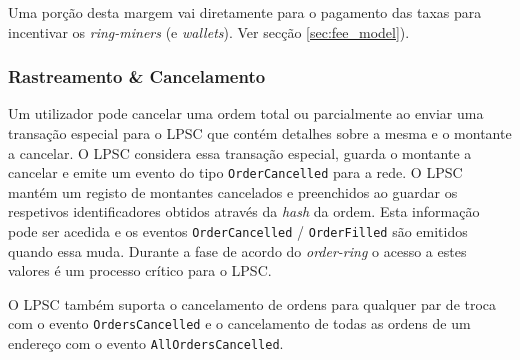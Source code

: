 \documentclass[UTF8,nofonts]{article}
\begin{document}
\begin{multicols}{2}
\begin{enumerate}

Uma porção desta margem vai diretamente para o pagamento das taxas para incentivar os \textit{ring-miners} (e \textit{wallets}). Ver secção 
\ref{sec:fee_model}).

\subsubsection{Rastreamento \& Cancelamento}


Um utilizador pode cancelar uma ordem total ou parcialmente ao enviar uma transação especial para o LPSC que contém detalhes sobre a mesma e o montante a cancelar. O LPSC considera essa transação especial, guarda o montante a cancelar e emite um evento do tipo \verb|OrderCancelled| para a rede. O LPSC mantém um registo de montantes cancelados e preenchidos ao guardar os respetivos identificadores obtidos através da \textit{hash} da ordem. Esta informação pode ser acedida e os eventos \verb|OrderCancelled| / \verb|OrderFilled| são emitidos quando essa muda. Durante a fase de acordo do \textit{order-ring} o acesso a estes valores é um processo crítico para o LPSC.


O LPSC também suporta o cancelamento de ordens para qualquer par de troca com o evento \verb|OrdersCancelled| e o cancelamento de todas as ordens de um endereço com o evento \verb|AllOrdersCancelled|.


\end{enumerate}
\end{multicols}
\end{document}
